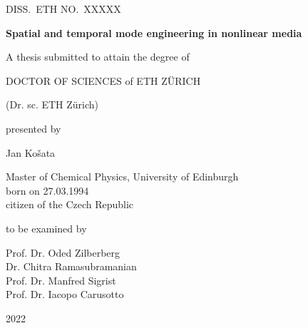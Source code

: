 
{%
 \begin{center}
%
{\Large   DISS.\ ETH NO.\ XXXXX}
\vspace*{\fill}


\vspace{0.2cm}

{\fontsize{16pt}{16pt} \sffamily  \bfseries \selectfont
Spatial and temporal mode engineering in nonlinear media
}

\vspace*{\fill}

{\sffamily A thesis submitted to attain the degree of}

{\MakeUppercase{Doctor of Sciences} of \MakeUppercase{ETH Z\"urich}}

(Dr. sc. ETH Z\"urich)

\vspace*{\fill}

{\sffamily  presented by }

Jan Ko\v{s}ata

Master of Chemical Physics, University of Edinburgh \\
born on 27.03.1994 \\
citizen of the Czech Republic

\vspace*{\fill}

{\sffamily to be examined by}

{Prof. Dr. Oded Zilberberg \\
Dr. Chitra Ramasubramanian \\
Prof. Dr. Manfred Sigrist\\
Prof. Dr. Iacopo Carusotto}

\vspace*{\fill}

{\Large 2022}

\leftskip=0mm
%
 \end{center}
}
\restoregeometry